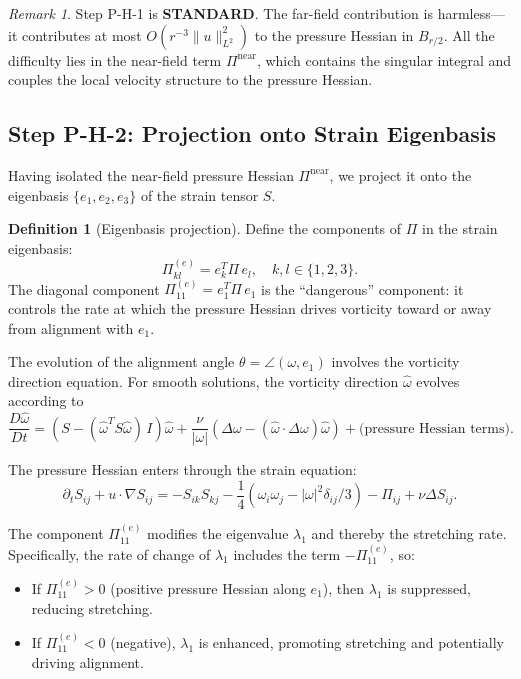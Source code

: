 \documentclass[11pt]{article}
\theoremstyle{definition}
\newtheorem{definition}[theorem]{Definition}
\theoremstyle{remark}
\newtheorem{remark}[theorem]{Remark}
\begin{document}
\begin{remark}
Step P-H-1 is \textbf{STANDARD}.  The far-field contribution is harmless---it
contributes at most $O(r^{-3}\|u\|_{L^2}^2)$ to the pressure Hessian in
$B_{r/2}$.  All the difficulty lies in the near-field term $\Pi^{\mathrm{near}}$,
which contains the singular integral and couples the local velocity structure to
the pressure Hessian.
\end{remark}

\subsection{Step P-H-2: Projection onto Strain Eigenbasis}
\label{sec:PH2}

Having isolated the near-field pressure Hessian $\Pi^{\mathrm{near}}$, we project
it onto the eigenbasis $\{e_1, e_2, e_3\}$ of the strain tensor $S$.

\begin{definition}[Eigenbasis projection]
Define the components of $\Pi$ in the strain eigenbasis:
\begin{equation}\label{eq:Pi-components}
  \Pi_{kl}^{(e)} = e_k^T \Pi\, e_l, \quad k,l \in \{1,2,3\}.
\end{equation}
The diagonal component $\Pi_{11}^{(e)} = e_1^T\Pi\, e_1$ is the ``dangerous''
component: it controls the rate at which the pressure Hessian drives vorticity
toward or away from alignment with $e_1$.
\end{definition}

The evolution of the alignment angle $\theta = \angle(\omega, e_1)$ involves the
vorticity direction equation.  For smooth solutions, the vorticity direction
$\hat\omega$ evolves according to
\begin{equation}\label{eq:direction-evolution}
  \frac{D\hat\omega}{Dt} = (S - (\hat\omega^T S\hat\omega)\, I)\hat\omega
  + \frac{\nu}{|\omega|}(\Delta\omega - (\hat\omega\cdot\Delta\omega)\hat\omega)
  + \text{(pressure Hessian terms)}.
\end{equation}

The pressure Hessian enters through the strain equation:
\begin{equation}\label{eq:strain-evolution}
  \partial_t S_{ij} + u\cdot\nabla S_{ij}
  = -S_{ik}S_{kj} - \frac{1}{4}(\omega_i\omega_j - |\omega|^2\delta_{ij}/3)
  - \Pi_{ij} + \nu\Delta S_{ij}.
\end{equation}

The component $\Pi_{11}^{(e)}$ modifies the eigenvalue $\lambda_1$ and thereby the
stretching rate.  Specifically, the rate of change of $\lambda_1$ includes the term
$-\Pi_{11}^{(e)}$, so:
\begin{itemize}[nosep]
  \item If $\Pi_{11}^{(e)} > 0$ (positive pressure Hessian along $e_1$), then
    $\lambda_1$ is suppressed, reducing stretching.
  \item If $\Pi_{11}^{(e)} < 0$ (negative), $\lambda_1$ is enhanced, promoting
    stretching and potentially driving alignment.
\end{itemize}
\end{document}
